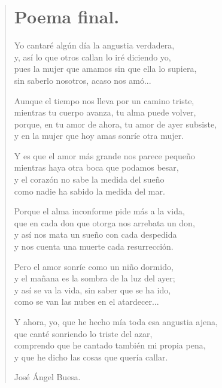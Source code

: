 \documentclass[11pt, portrait, twoside, notitlepage, openright]{book}
\begin{document}
\newpage
\begin{verse}
\begin{center}
\section{Poema final.}
\end{center}
Yo cantaré algún día la angustia verdadera,\\
y, así lo que otros callan lo iré diciendo yo,\\
pues la mujer que amamos sin que ella lo supiera,\\
sin saberlo nosotros, acaso nos amó...
\newline

Aunque el tiempo nos lleva por un camino triste,\\
mientras tu cuerpo avanza, tu alma puede volver,\\
porque, en tu amor de ahora, tu amor de ayer subsiste,\\
y en la mujer que hoy amas sonríe otra mujer.
\newline

Y es que el amor más grande nos parece pequeño\\
mientras haya otra boca que podamos besar,\\
y el corazón no sabe la medida del sueño\\
como nadie ha sabido la medida del mar.
\newline

Porque el alma inconforme pide más a la vida,\\
que en cada don que otorga nos arrebata un don,\\
y así nos mata un sueño con cada despedida\\
y nos cuenta una muerte cada resurrección.
\newline

Pero el amor sonríe como un niño dormido,\\
y el mañana es la sombra de la luz del ayer;\\
y así se va la vida, sin saber que se ha ido,\\
como se van las nubes en el atardecer...
\newpage

Y ahora, yo, que he hecho mía toda esa angustia ajena,\\
que canté sonriendo lo triste del azar,\\
comprendo que he cantado también mi propia pena,\\
y que he dicho las cosas que quería callar.
\newline

José Ángel Buesa.
\end{verse}
\end{document}
